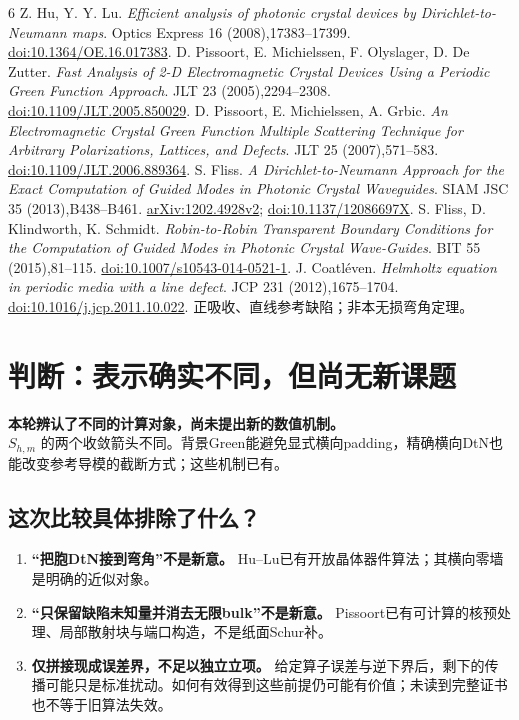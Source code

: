 \documentclass[UTF8,fontset=none,11pt,a4paper]{ctexart}
\newcommand{\takeaway}[1]{\begin{tcolorbox}[colback=pale,colframe=navy,boxrule=.5pt,arc=1mm,left=2mm,right=2mm,top=1.5mm,bottom=1.5mm]#1\end{tcolorbox}}
\newcommand{\nextpage}{\clearpage}
\begin{document}
\renewcommand{\refname}{最必要的六篇原文}
{\small
\begin{thebibliography}{6}
\setlength{\itemsep}{3pt}\setlength{\parskip}{0pt}
 Z. Hu, Y. Y. Lu. \emph{Efficient analysis of photonic crystal devices by Dirichlet-to-Neumann maps}. Optics Express 16 (2008),17383--17399. \href{https://doi.org/10.1364/OE.16.017383}{doi:10.1364/OE.16.017383}.
 D. Pissoort, E. Michielssen, F. Olyslager, D. De Zutter. \emph{Fast Analysis of 2-D Electromagnetic Crystal Devices Using a Periodic Green Function Approach}. JLT 23 (2005),2294--2308. \href{https://doi.org/10.1109/JLT.2005.850029}{doi:10.1109/JLT.2005.850029}.
 D. Pissoort, E. Michielssen, A. Grbic. \emph{An Electromagnetic Crystal Green Function Multiple Scattering Technique for Arbitrary Polarizations, Lattices, and Defects}. JLT 25 (2007),571--583. \href{https://doi.org/10.1109/JLT.2006.889364}{doi:10.1109/JLT.2006.889364}.
 S. Fliss. \emph{A Dirichlet-to-Neumann Approach for the Exact Computation of Guided Modes in Photonic Crystal Waveguides}. SIAM JSC 35 (2013),B438--B461. \href{https://arxiv.org/pdf/1202.4928v2}{arXiv:1202.4928v2}; \href{https://doi.org/10.1137/12086697X}{doi:10.1137/12086697X}.
 S. Fliss, D. Klindworth, K. Schmidt. \emph{Robin-to-Robin Transparent Boundary Conditions for the Computation of Guided Modes in Photonic Crystal Wave-Guides}. BIT 55 (2015),81--115. \href{https://doi.org/10.1007/s10543-014-0521-1}{doi:10.1007/s10543-014-0521-1}.
 J. Coatléven. \emph{Helmholtz equation in periodic media with a line defect}. JCP 231 (2012),1675--1704. \href{https://doi.org/10.1016/j.jcp.2011.10.022}{doi:10.1016/j.jcp.2011.10.022}. 正吸收、直线参考缺陷；非本无损弯角定理。
\end{thebibliography}}

\nextpage
\section{判断：表示确实不同，但尚无新课题}
\takeaway{\textbf{本轮辨认了不同的计算对象，尚未提出新的数值机制。}\\
\(S_{h,m}\) 的两个收敛箭头不同。背景Green能避免显式横向padding，精确横向DtN也能改变参考导模的截断方式；这些机制已有。}

\subsection*{这次比较具体排除了什么？}
\begin{enumerate}
 \item \textbf{“把胞DtN接到弯角”不是新意。} Hu--Lu已有开放晶体器件算法；其横向零墙是明确的近似对象。
 \item \textbf{“只保留缺陷未知量并消去无限bulk”不是新意。} Pissoort已有可计算的核预处理、局部散射块与端口构造，不是纸面Schur补。
 \item \textbf{仅拼接现成误差界，不足以独立立项。} 给定算子误差与逆下界后，剩下的传播可能只是标准扰动。如何有效得到这些前提仍可能有价值；未读到完整证书也不等于旧算法失效。
\end{enumerate}
\end{document}
